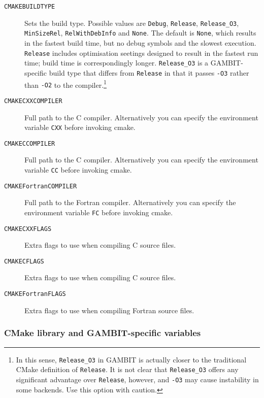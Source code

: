 \documentclass[pdftex,twocolumn,epjc3_preprint,runningheads]{svjour3}
\renewcommand{\_}{\discretionary{\underscore}{}{\underscore}}
\newcommand\term[1]{{\lstset{style=terminal}\lstinline!#1!\lstset{style=cpp}}}
\newcommand{\gambit}{\textsf{GAMBIT}\xspace}
\newcommand{\GB}{\gambit}
\newcommand\xx{\raisebox{0.2ex}{\smaller ++}\xspace}
\newcommand\Cpp{\textsf{C\xx}\xspace}
\newcommand\plainC{\textsf{C}\xspace}
\newcommand\Fortran{\textsf{Fortran}\xspace}
\begin{document}
\begin{description}
	\item[\tt{CMAKE\_BUILD\_TYPE}] Sets the build type. Possible values are \term{Debug}, \term{Release}, \term{Release_O3}, \term{MinSizeRel}, \term{RelWithDebInfo} and \term{None}.  The default is \term{None}, which results in the fastest build time, but no debug symbols and the slowest execution.  \term{Release} includes optimisation seetings designed to result in the fastest run time; build time is correspondingly longer.  \term{Release_O3} is a \GB-specific build type that differs from \term{Release} in that it passes \term{-O3} rather than \term{-O2} to the compiler.\footnote{In this sense, \term{Release_O3} in \GB is actually closer to the traditional \textsf{CMake} definition of \term{Release}.  It is not clear that \term{Release_O3} offers any significant advantage over \term{Release}, however, and \term{-O3} may cause instability in some backends.  Use this option with caution.}
	\item[\tt{CMAKE\_CXX\_COMPILER}] Full path to the \Cpp compiler. Alternatively you can specify the environment variable \term{CXX} before invoking cmake.
	\item[\tt{CMAKE\_C\_COMPILER}] Full path to the \plainC compiler. Alternatively you can specify the environment variable \term{CC} before invoking cmake.
	\item[\tt{CMAKE\_Fortran\_COMPILER}] Full path to the \Fortran compiler. Alternatively you can specify the environment variable \term{FC} before invoking cmake.
	\item[\tt{CMAKE\_CXX\_FLAGS}] Extra flags to use when compiling \Cpp source files.
	\item[\tt{CMAKE\_C\_FLAGS}] Extra flags to use when compiling \plainC source files.
	\item[\tt{CMAKE\_Fortran\_FLAGS}] Extra flags to use when compiling \Fortran source files.
\end{description}

\subsubsection{\textsf{CMake} library and \GB-specific variables}
\end{document}
